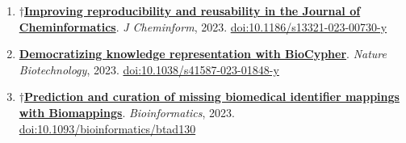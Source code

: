 \documentclass[10pt,a4paper,sans]{moderncv} %
\newcommand{\wikidata}[2]{\href{https://bioregistry.io/wikidata:#1?provider=scholia}{{#2}}}
\begin{document}
    \begin{enumerate}
    \setcounter{enumi}{0}
    \itemsep0.5em
        \item
        $\dagger$\wikidata{Q120200936}{\textbf{Improving reproducibility and reusability in the Journal of Cheminformatics}}.
    \textit{J Cheminform}, 2023.  {\scriptsize \href{https://bioregistry.io/doi:10.1186/S13321-023-00730-Y}{doi:10.1186/s13321-023-00730-y}}
        \item
        \wikidata{Q119813997}{\textbf{Democratizing knowledge representation with BioCypher}}.
    \textit{Nature Biotechnology}, 2023.  {\scriptsize \href{https://bioregistry.io/doi:10.1038/S41587-023-01848-Y}{doi:10.1038/s41587-023-01848-y}}
        \item
        $\dagger$\wikidata{Q118774152}{\textbf{Prediction and curation of missing biomedical identifier mappings with Biomappings}}.
    \textit{Bioinformatics}, 2023.  {\scriptsize \href{https://bioregistry.io/doi:10.1093/BIOINFORMATICS/BTAD130}{doi:10.1093/bioinformatics/btad130}}
    \end{enumerate}
\end{document}
